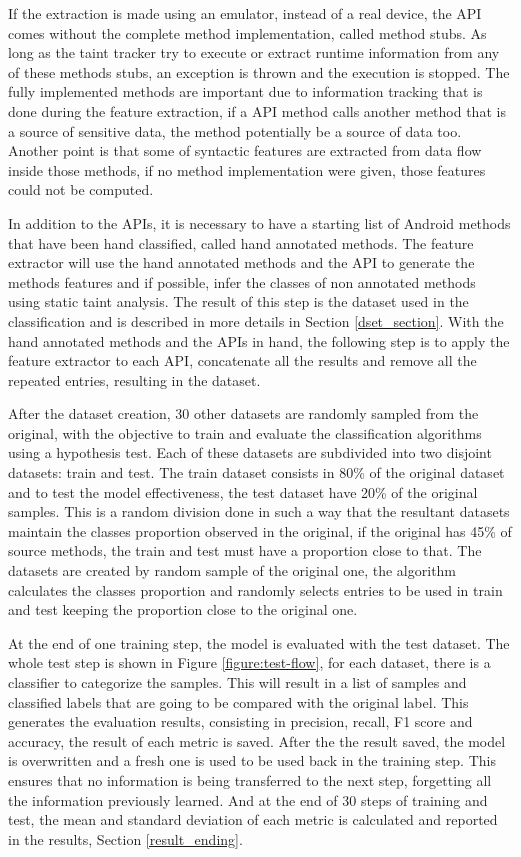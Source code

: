 If the extraction is made using an emulator, instead of a real device, the API comes without the complete method implementation, called method stubs. As long as the taint tracker try to execute or extract runtime information from any of these methods stubs, an exception is thrown and the execution is stopped. The fully implemented methods are important due to information tracking that is done during the feature extraction, if a API method calls another method that is a source of sensitive data, the method potentially be a source of data too. Another point is that some of syntactic features are extracted from data flow inside those methods, if no method implementation were given, those features could not be computed.

In addition to the APIs, it is necessary to have a starting list of Android methods that have been hand classified, called hand annotated methods.  The feature extractor will use the hand annotated methods and the API to generate the methods features and if possible, infer the classes of non annotated methods using static taint analysis. The result of this step is the dataset used in the classification and is described in more details in Section \ref{dset_section}. With the hand annotated methods and the APIs in hand, the following step is to apply the feature extractor to each API, concatenate all the results and remove all the repeated entries, resulting in the dataset.

After the dataset creation, 30 other datasets are randomly sampled from the original, with the objective to train and evaluate the classification algorithms using a hypothesis test. Each of these datasets are subdivided into two disjoint datasets: train and test. The train dataset consists in 80\% of the original dataset and to test the model effectiveness, the test dataset have 20\% of the original samples. This is a random division done in such a way that the resultant datasets maintain the classes proportion observed in the original, if the original has 45\% of source methods, the train and test must have a proportion close to that. The datasets are created by random sample of the original one, the algorithm calculates the classes proportion and randomly selects entries to be used in train and test keeping the proportion close to the original one.

At the end of one training step, the model is evaluated with the test dataset. The whole test step is shown in Figure \ref{figure:test-flow}, for each dataset, there is a classifier to categorize the samples. This will result in a list of samples and classified labels that are going to be compared with the original label. This generates the evaluation results, consisting in precision, recall, F1 score and accuracy, the result of each metric is saved. After the the result saved, the model is overwritten and a fresh one is used to be used back in the training step. This ensures that no information is being  transferred to the next step, forgetting all the information previously learned. And at the end of 30 steps of training and test, the mean and standard deviation of each metric is calculated and reported in the results, Section \ref{result_ending}.

